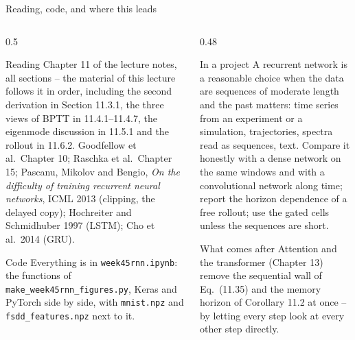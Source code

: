 \documentclass[10pt,aspectratio=169]{beamer}
\begin{document}
\begin{frame}{Reading, code, and where this leads}
\footnotesize
\begin{columns}[T]
\begin{column}{0.5\textwidth}
\begin{block}{Reading}
Chapter 11 of the lecture notes, all sections -- the material of this
lecture follows it in order, including the second derivation in Section
11.3.1, the three views of BPTT in 11.4.1--11.4.7, the eigenmode discussion
in 11.5.1 and the rollout in 11.6.2.  Goodfellow et al.\ Chapter 10; Raschka
et al.\ Chapter 15; Pascanu, Mikolov and Bengio, \emph{On the difficulty of
training recurrent neural networks}, ICML 2013 (clipping, the delayed copy);
Hochreiter and Schmidhuber 1997 (LSTM); Cho et al.\ 2014 (GRU).
\end{block}
\begin{block}{Code}
Everything is in \texttt{week45rnn.ipynb}: the functions of
\texttt{make\_week45rnn\_figures.py}, Keras and PyTorch side by side, with
\texttt{mnist.npz} and \texttt{fsdd\_features.npz} next to it.
\end{block}
\end{column}
\begin{column}{0.48\textwidth}
\begin{block}{In a project}
A recurrent network is a reasonable choice when the data are sequences of
moderate length and the past matters: time series from an experiment or a
simulation, trajectories, spectra read as sequences, text.  Compare it
honestly with a dense network on the same windows and with a convolutional
network along time; report the horizon dependence of a free rollout; use
the gated cells unless the sequences are short.
\end{block}
\begin{block}{What comes after}
Attention and the transformer (Chapter 13) remove the sequential wall of
Eq.~(11.35) and the memory horizon of Corollary 11.2 at once -- by letting
every step look at every other step directly.
\end{block}
\end{column}
\end{columns}
\end{frame}
\end{document}
